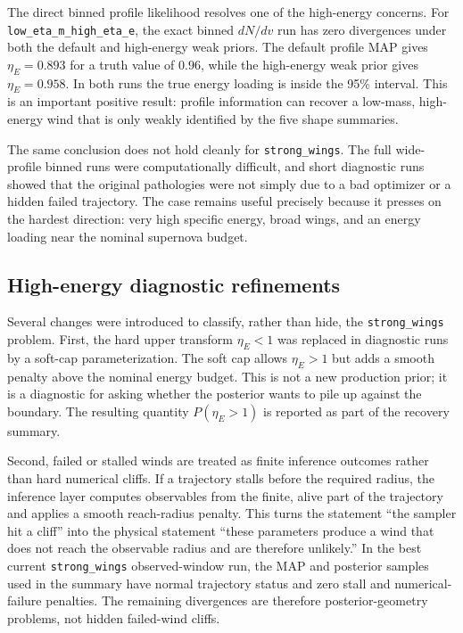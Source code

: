 The direct binned profile likelihood resolves one of the high-energy concerns.
For \texttt{low\_eta\_m\_high\_eta\_e}, the exact binned $dN/dv$ run has zero
divergences under both the default and high-energy weak priors.  The default
profile MAP gives $\eta_E=0.893$ for a truth value of $0.96$, while the
high-energy weak prior gives $\eta_E=0.958$.  In both runs the true energy
loading is inside the 95\% interval.  This is an important positive result:
profile information can recover a low-mass, high-energy wind that is only weakly
identified by the five shape summaries.

The same conclusion does not hold cleanly for \texttt{strong\_wings}.  The full
wide-profile binned runs were computationally difficult, and short diagnostic
runs showed that the original pathologies were not simply due to a bad optimizer
or a hidden failed trajectory.  The case remains useful precisely because it
presses on the hardest direction: very high specific energy, broad wings, and an
energy loading near the nominal supernova budget.

\subsection{High-energy diagnostic refinements}
\label{subsec:synthetic_recovery_high_energy}

Several changes were introduced to classify, rather than hide, the
\texttt{strong\_wings} problem.  First, the hard upper transform
$\eta_E<1$ was replaced in diagnostic runs by a soft-cap parameterization.  The
soft cap allows $\eta_E>1$ but adds a smooth penalty above the nominal energy
budget.  This is not a new production prior; it is a diagnostic for asking
whether the posterior wants to pile up against the boundary.  The resulting
quantity $P(\eta_E>1)$ is reported as part of the recovery summary.

Second, failed or stalled winds are treated as finite inference outcomes rather
than hard numerical cliffs.  If a trajectory stalls before the required radius,
the inference layer computes observables from the finite, alive part of the
trajectory and applies a smooth reach-radius penalty.  This turns the statement
``the sampler hit a cliff'' into the physical statement ``these parameters
produce a wind that does not reach the observable radius and are therefore
unlikely.''  In the best current \texttt{strong\_wings} observed-window run, the
MAP and posterior samples used in the summary have normal trajectory status and
zero stall and numerical-failure penalties.  The remaining divergences are
therefore posterior-geometry problems, not hidden failed-wind cliffs.

